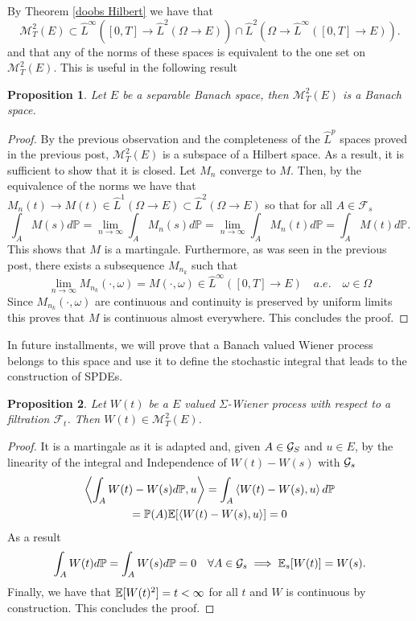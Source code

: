 \documentclass[12pt]{article}
\newtheorem{proposition}{Proposition}
\newcommand{\br}[1]{\left\langle#1\right\rangle}
\begin{document}
By Theorem \ref{doobs Hilbert} we have that
\begin{equation*}
	\mathcal{M}_T^2(E)\subset \hat{L}^\infty([0,T]\to \hat{L}^2(\Omega\to E))\cap \hat{L}^2(\Omega\to \hat{L}^\infty([0,T]\to E)).
\end{equation*}
and that any of the norms of these spaces is equivalent to the one set on $\mathcal{M}_T^2(E)$. This is useful in the following result
\begin{proposition}
	Let $E$ be a separable Banach space, then $\mathcal{M}_T^2(E)$ is a Banach space.
\end{proposition}
\begin{proof}
	By the previous observation  and the completeness of the $\hat{L}^p$ spaces proved in the previous post, $\mathcal{M}_T^2(E)$ is a subspace of a Hilbert space. As a result, it is sufficient to show that it is closed. Let $M_n$ converge to $M$. Then, by the equivalence of the norms we have that $M_n(t)\to M(t)\in \hat{L}^1(\Omega\to E)\subset \hat{L}^2(\Omega\to E)$ so that for all $A\in\mathcal{F}_s$
	\begin{equation*}
		\int_A M(s)d\mathbb{P}=\lim_{n\to\infty}\int_A M_n(s)d\mathbb{P}=\lim_{n\to\infty}\int_A M_n(t)d\mathbb{P}=\int_A M(t)d\mathbb{P}.
	\end{equation*}
	This shows that $M$ is a martingale. Furthermore, as was seen in the previous post, there exists a subsequence $M_{n_k}$ such that
	\begin{equation*}
		\lim_{n\to\infty}{M_{n_k}}(\cdot,\omega)=M(\cdot,\omega)\in \hat{L}^\infty([0,T]\to E)\quad a.e.\quad \omega\in\Omega
	\end{equation*}
	Since $M_{n_k}(\cdot,\omega)$ are continuous and continuity is preserved by uniform limits this proves that $M$ is continuous almost everywhere. This concludes the proof.
\end{proof}
In future installments, we will prove that a Banach valued Wiener process belongs to this space and use it to define the stochastic integral that leads to the construction of SPDEs.
\begin{proposition}
	Let $W(t)$ be a $E$ valued $\Sigma$-Wiener process with respect to a filtration $\mathcal{F}_t$. Then $W(t)\in \mathcal{M}_T^2(E)$.
\end{proposition}
\begin{proof}
	It is a martingale as it is adapted and, given $A\in\mathcal{G}_S$ and $u\in E$, by the linearity of the integral and Independence of $W(t)-W(s)$ with $\mathcal{G}_s$
	\begin{multline*}
		\br{\int_A W(t)-W(s)d\PP,u}=\int_A \br{W(t)-W(s),u}d\PP\\=
		\PP(A)\E[\br{W(t)-W(s),u}]=0
	\end{multline*}
	As a result
	\begin{equation*}
		\int_A W(t)d\mathbb{P}=\int_A W(s)d\mathbb{P}=0\quad \forall A\in\mathcal{G}_s\implies \mathbb{E}_s[W(t)]=W(s).
	\end{equation*}
	Finally, we have that $\mathbb{E}[W(t)^2]=t<\infty$ for all $t$ and $W$ is continuous by construction. This concludes the proof.
\end{proof}


\end{document}
